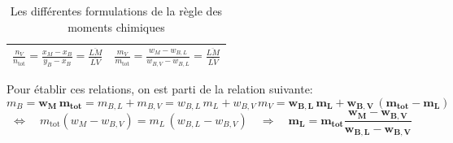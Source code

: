 \documentclass[a4paper,12pt]{article}
\begin{document}
\begin{table}[!ht]
\begin{tabular}{|c|c|}
                \\[2mm]

                \(
                \displaystyle
                \frac{n_V}{n_{\text{tot}}}
                = \frac{x_M - x_B}{y_B - x_B}
                = \frac{\overline{LM}}{\overline{LV}}
                \)
                &
                \(
                \displaystyle
                \frac{m_V}{m_{\text{tot}}}
                = \frac{w_M - w_{B,L}}{w_{B,V} - w_{B,L}}
                = \frac{\overline{LM}}{\overline{LV}}
                \)
                \\[2mm]
                \hline

                \end{tabular}
                \caption{Les différentes formulations de la règle des moments chimiques}

            \end{table}

            Pour établir ces relations, on est parti de la relation suivante:
                $$ m_B = \bm{w_M \, m_{\text{tot}}} = m_{B,L} + m_{B,V} = w_{B,L} \, m_L + w_{B,V} \, m_V = \bm{ w_{B,L} \, m_L + w_{B,V} \, (m_{\text{tot}} - m_L) } $$
                $$ \Longleftrightarrow \quad m_{\text{tot}} (w_M - w_{B,V}) = m_L \, (w_{B,L} - w_{B,V}) \quad \Longrightarrow \quad \bm{ m_L = m_{\text{tot}} \frac{w_M - w_{B,V}}{w_{B,L} - w_{B,V}} }$$
\end{document}
